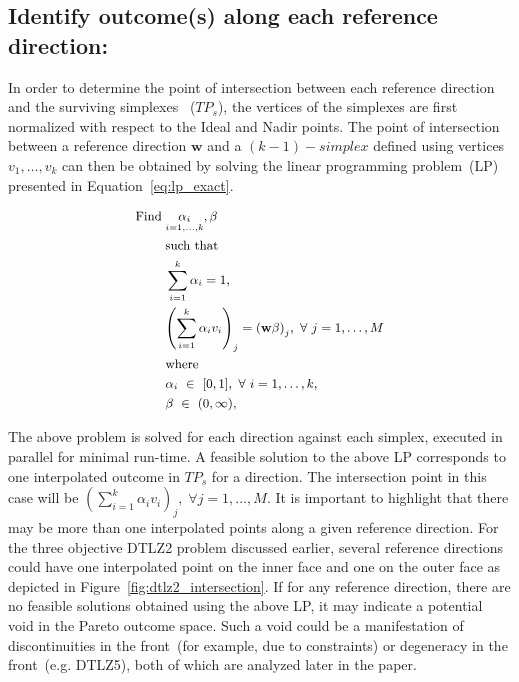 \subsection{Identify outcome(s) along each reference direction:} In order to determine the point of intersection between each reference direction and the surviving {\color{blue}simplexes} ~($TP_s$), the vertices of the {\color{blue}simplexes} are first normalized with respect to the Ideal and Nadir points. The point of intersection between a reference direction $\textbf{w}$ and a {\color{blue}$(k-1)-simplex$} defined using vertices $v_1,\dots,v_k$ can then be obtained by solving the linear programming problem~(LP) presented in Equation~\ref{eq:lp_exact}.

\begin{equation}\small
\begin{aligned}
\operatorname{Find} \; & \underset{i=1,\dots,k}{\alpha_i},\beta\\
& \text{such that}\\
& \sum_{i = 1}^k \alpha_i = 1,\\
& {\left(\sum_{i = 1}^k \alpha_iv_i\right)}_j = {(\textbf{w}\beta)}_j,~\forall~j = 1,\dots,M \\
& \text{where}\\
& \alpha_i~\in~[0,1],~\forall~i = 1,\dots,k,\\ 
& \beta~\in~(0,\infty),\\  
\label{eq:lp_exact}
\end{aligned}
\end{equation}

The above problem is solved for each direction against each {\color{blue}simplex}, executed in parallel for minimal run-time. A feasible solution to the above LP corresponds to one interpolated outcome in $TP_s$ for a direction. The intersection point in this case will be ${\left(\sum_{i = 1}^k \alpha_iv_i\right)}_j,\;\forall j = 1,\dots,M$. It is important to highlight that there may be more than one interpolated points along a given reference direction. For the three objective DTLZ2 problem discussed earlier, several reference directions could have one interpolated point on the inner face and one on the outer face as depicted in Figure~\ref{fig:dtlz2_intersection}. If for any reference direction, there are no feasible solutions obtained using the above LP, it may indicate a potential void in the Pareto outcome space. Such a void could be a manifestation of discontinuities in the front~(for example, due to constraints) or degeneracy in the front~(e.g. DTLZ5), both of which are analyzed later in the paper.

